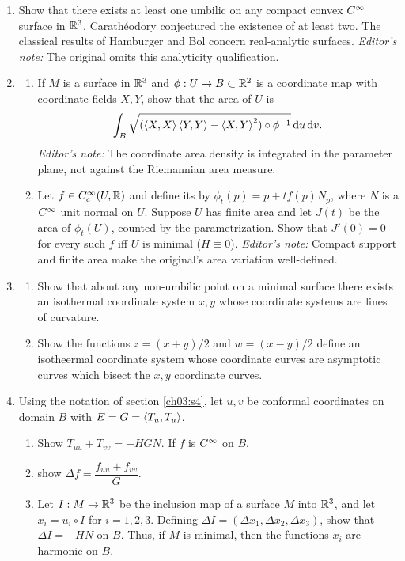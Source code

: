 \documentclass[../main]{subfiles}
\begin{document}
\begin{enumerate}
    \item\label{pro:86} Show that there exists at least one umbilic on any compact convex $C^\infty$ surface in $\mathbb{R}^3$. Carath\'eodory conjectured the existence of at least two. The classical results of Hamburger and Bol concern real-analytic surfaces. \emph{Editor's note:} The original omits this analyticity qualification.
    \item\label{pro:87} 
    \begin{enumerate}[label=(\roman*)]
        \item If $M$ is a surface in $\mathbb{R}^3$ and $\phi:U\to B\subset\mathbb{R}^2$ is a coordinate map with coordinate fields $X,Y$, show that the area of $U$ is \[\int_B\sqrt{(\left\langle X,X\right\rangle\left\langle Y,Y\right\rangle-\left\langle X,Y\right\rangle^2)\circ\phi^{-1}}\,\mathrm{d}u\,\mathrm{d}v.\] \emph{Editor's note:} The coordinate area density is integrated in the parameter plane, not against the Riemannian area measure.
        \item Let $f\in C^\infty_c(U,\mathbb{R})$ and define its  by $\phi_t(p)=p+tf(p)N_p$, where $N$ is a $C^\infty$ unit normal on $U$. Suppose $U$ has finite area and let $J(t)$ be the area of $\phi_t(U)$, counted by the parametrization. Show that $J'(0)=0$ for every such $f$ iff $U$ is minimal ($H\equiv0$). \emph{Editor's note:} Compact support and finite area make the original's area variation well-defined.
    \end{enumerate}
    
    \item\label{pro:88}
    \begin{enumerate}[label=(\roman*)]
        \item  Show that about any non-umbilic point on a minimal surface there exists an isothermal coordinate system $x,y$ whose coordinate systems are lines of curvature. 
        \item Show the functions $z=(x+y)/2$ and $w = (x-y)/2$ define an isotheermal coordinate system whose coordinate curves are asymptotic curves which bisect the $x,y$ coordinate curves.
    \end{enumerate}
    
    \item\label{pro:89} Using the notation of section \ref{ch03:s4}, let $u,v$ be conformal coordinates on domain $B$ with $E=G=\left\langle T_u,T_u\right\rangle$.
    \begin{enumerate}[label=(\roman*)]
        \item Show $T_{uu} + T_{vv} = -HGN$. If $f$ is $C^\infty$ on $B$,
        \item show $\Delta f = \dfrac{f_{uu} + f_{vv}}{G}$.
        \item Let $I:M\to \mathbb{R}^3$ be the inclusion map of a surface $M$ into $\mathbb{R}^3$, and let $x_i = u_i\circ I$ for $i=1,2,3$. Defining $\Delta I = (\Delta x_1, \Delta x_2, \Delta x_3)$, show that $\Delta I = -HN$ on $B$. Thus, if $M$ is minimal, then the functions $x_i$ are harmonic on $B$. 
    \end{enumerate}
      

\end{enumerate}
\end{document}
